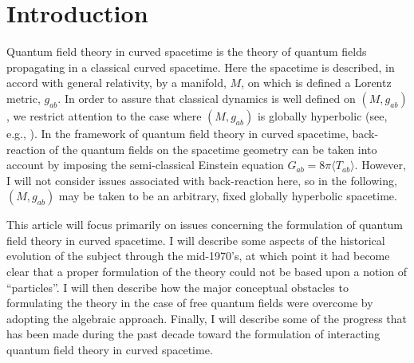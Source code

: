 \documentclass[12pt,epsf,amsfonts,amssymb]{article}
\begin{document}
\linespread{1.05}

\section{Introduction} 

Quantum field theory in curved spacetime is the theory of quantum
fields propagating in a classical curved spacetime. 
Here the spacetime
is described, in accord with general relativity, by a manifold, $M$,
on which is defined a Lorentz metric, $g_{ab}$. In order to assure
that classical dynamics is well defined on $(M, g_{ab})$, we restrict
attention to the case where $(M, g_{ab})$ is globally hyperbolic (see,
e.g., \cite{w1}). In the framework of quantum field theory in curved
spacetime, back-reaction of the quantum fields on the spacetime
geometry can be taken into account by imposing the semi-classical
Einstein equation $G_{ab} = 8 \pi \langle T_{ab} \rangle$. However, I will not
consider issues associated with back-reaction here, so in the
following, $(M, g_{ab})$ may be taken to be an arbitrary, fixed
globally hyperbolic spacetime.

This article will focus primarily on issues concerning the formulation
of quantum field theory in curved spacetime. I will describe some
aspects of the historical evolution of the subject through the
mid-1970's, at which point it had become clear that a proper
formulation of the theory could not be based upon a notion of
``particles''. I will then describe how the major conceptual obstacles
to formulating the theory in the case of free quantum fields were
overcome by adopting the algebraic approach. Finally, I will describe some
of the progress that has been made during the past decade toward the
formulation of interacting quantum field theory in curved spacetime.
\end{document}
